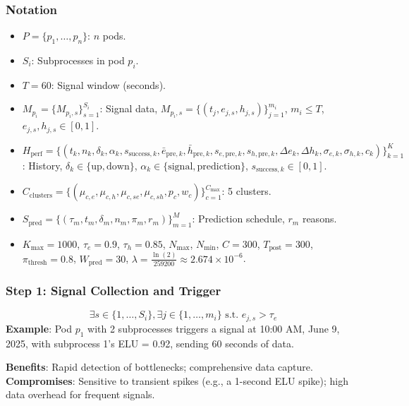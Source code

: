 \documentclass[12pt]{article}
\begin{document}
\subsubsection{Notation}
\begin{itemize}
    \item $P = \{p_1, \dots, p_n\}$: $n$ pods.
    \item $S_i$: Subprocesses in pod $p_i$.
    \item $T = 60$: Signal window (seconds).
    \item $M_{p_i} = \{M_{p_i,s}\}_{s=1}^{S_i}$: Signal data, $M_{p_i,s} = \{(t_j, e_{j,s}, h_{j,s})\}_{j=1}^{m_i}$, $m_i \leq T$, $e_{j,s}, h_{j,s} \in [0,1]$.
    \item $H_{\text{perf}} = \{(t_k, n_k, \delta_k, \alpha_k, s_{\text{success},k}, \bar{e}_{\text{pre},k}, \bar{h}_{\text{pre},k}, s_{e,\text{pre},k}, s_{h,\text{pre},k}, \Delta e_k, \Delta h_k, \sigma_{e,k}, \sigma_{h,k}, c_k)\}_{k=1}^K$: History, $\delta_k \in \{\text{up}, \text{down}\}$, $\alpha_k \in \{\text{signal}, \text{prediction}\}$, $s_{\text{success},k} \in [0,1]$.
    \item $C_{\text{clusters}} = \{(\mu_{c,e}, \mu_{c,h}, \mu_{c,se}, \mu_{c,sh}, p_c, w_c)\}_{c=1}^{C_{\text{max}}}$: 5 clusters.
    \item $S_{\text{pred}} = \{(\tau_m, t_m, \delta_m, n_m, \pi_m, r_m)\}_{m=1}^M$: Prediction schedule, $r_m$ reasons.
    \item $K_{\text{max}} = 1000$, $\tau_e = 0.9$, $\tau_h = 0.85$, $N_{\text{max}}$, $N_{\text{min}}$, $C = 300$, $T_{\text{post}} = 300$, $\pi_{\text{thresh}} = 0.8$, $W_{\text{pred}} = 30$, $\lambda = \frac{\ln(2)}{259200} \approx 2.674 \times 10^{-6}$.
\end{itemize}

\subsubsection{Step 1: Signal Collection and Trigger}
\[
\exists s \in \{1, \dots, S_i\}, \exists j \in \{1, \dots, m_i\} \text{ s.t. } e_{j,s} > \tau_e
\]
\textbf{Example}: Pod $p_1$ with 2 subprocesses triggers a signal at 10:00 AM, June 9, 2025, with subprocess 1’s ELU = 0.92, sending 60 seconds of data.

\textbf{Benefits}: Rapid detection of bottlenecks; comprehensive data capture.
\textbf{Compromises}: Sensitive to transient spikes (e.g., a 1-second ELU spike); high data overhead for frequent signals.
\end{document}
